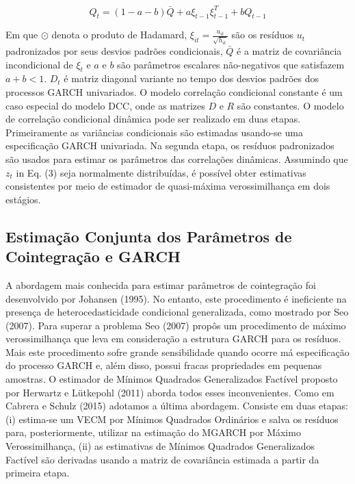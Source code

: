 \documentclass[a4paper,12pt] {article}
\begin{document}
   \begin{equation}
   Q_{t}=(1-a-b) \bar{Q} + a \xi_{t-1} \xi_{t-1}^T+bQ_{t-1}
   \end{equation}
   
 Em que $\odot$ denota o produto de Hadamard, $\xi_{it} =  \frac{u_{it}}{\sqrt{h_{it}}}$  são os resíduos $u_t$ padronizados  por seus desvios padrões condicionais, $\bar{Q}$ é a matriz de covariância incondicional de $\xi_{t}$ e $a$ e $b$ são parâmetros escalares não-negativos que satisfazem $a + b<1$. $D_t$ é matriz diagonal variante no tempo dos desvios padrões dos processos GARCH univariados. O modelo correlação condicional constante é um caso especial do modelo DCC, onde as matrizes $D$ e $R$ são constantes.
 O modelo de correlação condicional dinâmica pode ser realizado em duas etapas. Primeiramente as variâncias condicionais são estimadas usando-se uma especificação GARCH univariada. Na segunda etapa, os resíduos padronizados são usados para estimar os parâmetros das correlações dinâmicas.
 Assumindo que $z_t$ in Eq. (3) seja normalmente distribuídas, é possível obter estimativas consistentes por meio de estimador de quasi-máxima verossimilhança em dois estágios.  
 	
 \subsection{Estimação Conjunta dos Parâmetros de Cointegração e GARCH} 
 

	A abordagem mais conhecida para estimar parâmetros de cointegração  foi desenvolvido por Johansen (1995). No entanto, este procedimento é ineficiente na presença de heterocedasticidade condicional generalizada, como mostrado por Seo (2007). Para superar a problema Seo (2007) propôs um procedimento de máximo verossimilhança que leva em consideração a estrutura GARCH para os resíduos. Mais este procedimento sofre grande sensibilidade quando ocorre má especificação do  processo GARCH e, além disso, possui fracas propriedades em pequenas amostras.  O estimador de Mínimos Quadrados Generalizados Factível proposto por Herwartz e Lütkepohl (2011) aborda todos esses inconvenientes. Como em  Cabrera e Schulz (2015) adotamos a última abordagem. Consiste em duas etapas: (i) estima-se um VECM por Mínimos Quadrados Ordinários e salva os resíduos  para,  posteriormente, utilizar na estimação do MGARCH por Máximo Verossimilhança, (ii) as estimativas de Mínimos Quadrados Generalizados Factível são derivadas usando a matriz de covariância estimada a partir da primeira etapa.
	
\end{document}
